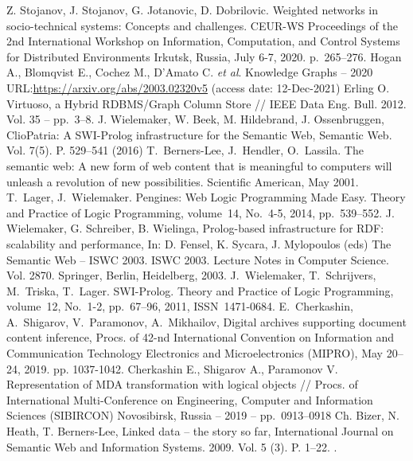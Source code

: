 \documentclass[
]{aiitart}
\begin{document}
\begin{thebibliography}{99}
 Z. Stojanov, J. Stojanov, G. Jotanovic, D. Dobrilovic. Weighted networks in socio-technical systems: Concepts and challenges. CEUR-WS Proceedings of the 2nd International Workshop on Information, Computation, and Control Systems for Distributed Environments Irkutsk, Russia, July 6-7, 2020. p.~265--276.
 Hogan A., Blomqvist E., Cochez M., D’Amato C. \emph{et al}. Knowledge Graphs -- 2020 URL:\url{https://arxiv.org/abs/2003.02320v5} (access date: 12-Dec-2021)
 Erling O. Virtuoso, a Hybrid RDBMS/Graph Column Store // IEEE Data Eng. Bull. 2012. Vol. 35 -- pp.~3--8.
  J. Wielemaker, W. Beek, M. Hildebrand, J. Ossenbruggen, ClioPatria: A
  SWI-Prolog infrastructure for the Semantic Web, Semantic Web.
  Vol. 7(5). P. 529--541 (2016) 
 T.~Berners-Lee, J.~Hendler, O.~Lassila.  The semantic web: A new form of web content that is meaningful to computers will unleash a revolution of new possibilities.  Scientific American, May 2001.
 T.~Lager, J.~Wielemaker. Pengines: Web Logic Programming Made Easy.  Theory and Practice of Logic Programming, volume~14, No.~4-5, 2014, pp.~539--552. 
  J. Wielemaker, G. Schreiber, B. Wielinga, Prolog-based infrastructure
  for RDF: scalability and performance, In: D. Fensel, K. Sycara,
  J. Mylopoulos (eds) The Semantic Web -- ISWC 2003. ISWC 2003. Lecture
  Notes in Computer Science. Vol. 2870. Springer, Berlin,
  Heidelberg, 2003.
 J.~Wielemaker, T.~Schrijvers, M.~Triska, T.~Lager. SWI-Prolog. Theory and Practice of Logic Programming, volume~12, No.~1-2, pp.~67--96, 2011, ISSN~1471-0684.
 E.~Cherkashin, A.~Shigarov, V.~Paramonov, A.~Mikhailov, Digital archives supporting document content inference, Procs.  of 42-nd International Convention on Information and Communication Technology Electronics and Microelectronics (MIPRO), May 20–24, 2019.  pp. 1037-1042. 
 Cherkashin E., Shigarov A., Paramonov V. Representation of MDA transformation with logical objects // Procs. of International Multi-Conference on Engineering, Computer and Information Sciences (SIBIRCON) Novosibirsk, Russia -- 2019 -- pp.~0913--0918 
 Ch. Bizer, N. Heath, T. Berners-Lee, Linked data -- the story so
  far, International Journal on Semantic Web and Information Systems.
  2009. Vol. 5 (3). P. 1--22. .

\end{thebibliography}
\end{document}
